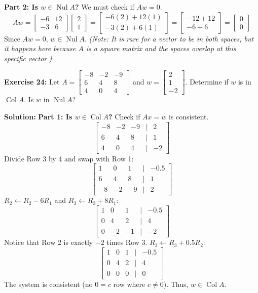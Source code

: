 \documentclass[11pt]{article}
\begin{document}
\textbf{Part 2: Is $w \in \operatorname{Nul} A$?}
We must check if $Aw = 0$.
\[
Aw = \begin{bmatrix} -6 & 12 \\ -3 & 6 \end{bmatrix} \begin{bmatrix} 2 \\ 1 \end{bmatrix} = \begin{bmatrix} -6(2) + 12(1) \\ -3(2) + 6(1) \end{bmatrix} = \begin{bmatrix} -12 + 12 \\ -6 + 6 \end{bmatrix} = \begin{bmatrix} 0 \\ 0 \end{bmatrix}
\]
Since $Aw = 0$, $w \in \operatorname{Nul} A$.
\textit{(Note: It is rare for a vector to be in both spaces, but it happens here because $A$ is a square matrix and the spaces overlap at this specific vector.)}

\vspace{0.5cm}

\textbf{Exercise 24:} Let $A = \begin{bmatrix} -8 & -2 & -9 \\ 6 & 4 & 8 \\ 4 & 0 & 4 \end{bmatrix}$ and $w = \begin{bmatrix} 2 \\ 1 \\ -2 \end{bmatrix}$. Determine if $w$ is in $\operatorname{Col} A$. Is $w$ in $\operatorname{Nul} A$?

\textbf{Solution:}
\textbf{Part 1: Is $w \in \operatorname{Col} A$?}
Check if $Ax = w$ is consistent.
\[
\begin{bmatrix} -8 & -2 & -9 & \big| & 2 \\ 6 & 4 & 8 & \big| & 1 \\ 4 & 0 & 4 & \big| & -2 \end{bmatrix}
\]
Divide Row 3 by 4 and swap with Row 1:
\[
\begin{bmatrix} 1 & 0 & 1 & \big| & -0.5 \\ 6 & 4 & 8 & \big| & 1 \\ -8 & -2 & -9 & \big| & 2 \end{bmatrix}
\]
$R_2 \leftarrow R_2 - 6R_1$ and $R_3 \leftarrow R_3 + 8R_1$:
\[
\begin{bmatrix} 1 & 0 & 1 & \big| & -0.5 \\ 0 & 4 & 2 & \big| & 4 \\ 0 & -2 & -1 & \big| & -2 \end{bmatrix}
\]
Notice that Row 2 is exactly $-2$ times Row 3. $R_3 \leftarrow R_3 + 0.5R_2$:
\[
\begin{bmatrix} 1 & 0 & 1 & \big| & -0.5 \\ 0 & 4 & 2 & \big| & 4 \\ 0 & 0 & 0 & \big| & 0 \end{bmatrix}
\]
The system is consistent (no $0 = c$ row where $c \neq 0$). Thus, $w \in \operatorname{Col} A$.
\end{document}

